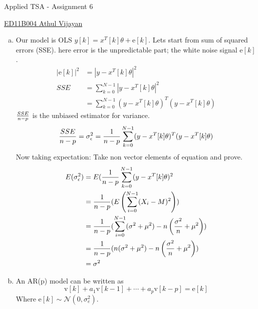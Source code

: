 \documentclass[11pt,paper=a4,answers]{exam}
\newcommand{\e}{\mathrm{e}}
\renewcommand{\v}{\mathrm{v}}
\begin{document}
\noindent
\begin{minipage}[l]{.1\textwidth}%
\noindent
\end{minipage}
\hfill
\begin{minipage}[r]{.68\textwidth}%
\begin{center}
{\large \bfseries \par
\Large Applied TSA - Assignment 6 \\[2pt]
\vspace{6pt}
\small   \par}
\end{center}
\end{minipage}
\begin{minipage}[l]{.195\textwidth}%
\noindent
{\footnotesize}
\end{minipage}
\par
\noindent
\uline{ED11B004 \hfill \normalsize\emph \hfill       Athul Vijayan}\\
\begin{questions}
\question 
\begin{enumerate}[a.]
    \item Our model is OLS $y[k] = x^T[k] \theta + \e[k]$. Lets start from sum of squared errors (SSE). here error is the unpredictable part; the white noise signal $\e[k]$.
    \begin{align*}
        |\e[k]|^2 &= |y - x^T[k] \theta|^2 \\
        SSE &= \sum_{k=0}^{N-1} |y - x^T[k] \theta|^2 \\
        &= \sum_{k=0}^{N-1} (y - x^T[k] \theta)^T (y - x^T[k] \theta)
    \end{align*}
    ${SSE\over n-p}$ is the unbiased estimator for variance.
    $${SSE\over n-p} = \sigma_{\epsilon}^2 = {1 \over n-p} \sum_{k=0}^{N-1} (y - x^T[k] \theta)^T (y - x^T[k] \theta)$$
    Now taking expectation:
    Take non vector elements of equation and prove.
    \begin{align*}
        E(\sigma_{\epsilon}^2) &= E({1 \over n-p} \sum_{k=0}^{N-1} (y - x^T[k] \theta)^2\\
        &= {1 \over n-p}(E\left(\sum_{i=0}^{N-1} (X_i - M)^2\right)) \\
        &= {1 \over n-p}( \sum_{i=0}^{N-1} (\sigma^2 + \mu^2) - n \left(\frac{\sigma^2}{n} + \mu^2\right) )\\
        &= {1 \over n-p}(n (\sigma^2 + \mu^2) -n \left(\frac{\sigma^2}{n} + \mu^2\right)) \\
        &= \sigma^2
    \end{align*}
    \item An AR(p) model can be written as
    $$ \v[k] + a_1 \v[k-1] + \cdots + a_p \v[k-p] = \e[k] $$
    Where $\e[k] \sim \mathcal{N}(0, \sigma_{e} ^2)$.\\
    
\end{enumerate}


\end{questions}
\end{document}
